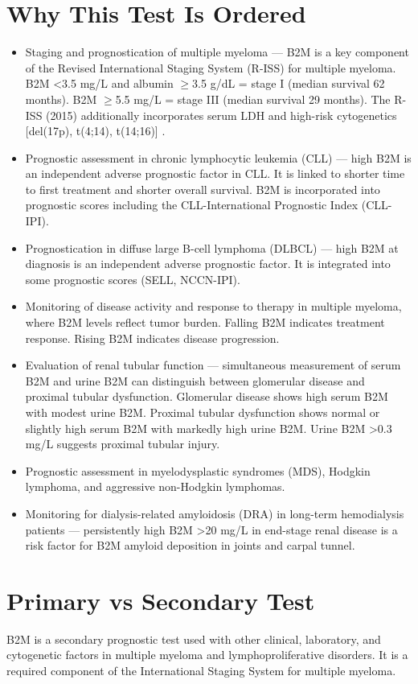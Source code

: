 \section*{Why This Test Is Ordered}
\begin{itemize}
  \item Staging and prognostication of multiple myeloma --- B2M is a key component of the Revised International Staging System (R-ISS) for multiple myeloma. B2M <3.5 mg/L and albumin $\geq$3.5 g/dL = stage I (median survival 62 months). B2M $\geq$5.5 mg/L = stage III (median survival 29 months). The R-ISS (2015) additionally incorporates serum LDH and high-risk cytogenetics [del(17p), t(4;14), t(14;16)] \cite{palumbo2015revised}.
  \item Prognostic assessment in chronic lymphocytic leukemia (CLL) --- high B2M is an independent adverse prognostic factor in CLL. It is linked to shorter time to first treatment and shorter overall survival. B2M is incorporated into prognostic scores including the CLL-International Prognostic Index (CLL-IPI).
  \item Prognostication in diffuse large B-cell lymphoma (DLBCL) --- high B2M at diagnosis is an independent adverse prognostic factor. It is integrated into some prognostic scores (SELL, NCCN-IPI).
  \item Monitoring of disease activity and response to therapy in multiple myeloma, where B2M levels reflect tumor burden. Falling B2M indicates treatment response. Rising B2M indicates disease progression.
  \item Evaluation of renal tubular function --- simultaneous measurement of serum B2M and urine B2M can distinguish between glomerular disease and proximal tubular dysfunction. Glomerular disease shows high serum B2M with modest urine B2M. Proximal tubular dysfunction shows normal or slightly high serum B2M with markedly high urine B2M. Urine B2M >0.3 mg/L suggests proximal tubular injury.
  \item Prognostic assessment in myelodysplastic syndromes (MDS), Hodgkin lymphoma, and aggressive non-Hodgkin lymphomas.
  \item Monitoring for dialysis-related amyloidosis (DRA) in long-term hemodialysis patients --- persistently high B2M >20 mg/L in end-stage renal disease is a risk factor for B2M amyloid deposition in joints and carpal tunnel.
\end{itemize}

\section*{Primary vs Secondary Test}
B2M is a secondary prognostic test used with other clinical, laboratory, and cytogenetic factors in multiple myeloma and lymphoproliferative disorders. It is a required component of the International Staging System for multiple myeloma.

